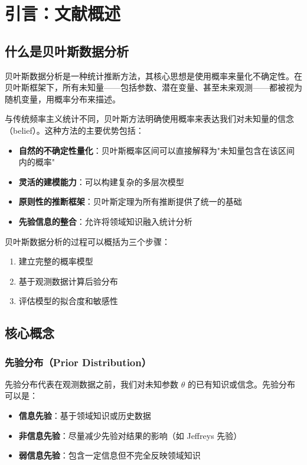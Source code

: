 
\chapter*{引言：文献概述}
\label{chap:introduction}

\section{什么是贝叶斯数据分析}

贝叶斯数据分析是一种统计推断方法，其核心思想是使用概率来量化不确定性。在贝叶斯框架下，所有未知量——包括参数、潜在变量、甚至未来观测——都被视为随机变量，用概率分布来描述。

与传统频率主义统计不同，贝叶斯方法明确使用概率来表达我们对未知量的信念（belief）。这种方法的主要优势包括：

\begin{itemize}
  \item \textbf{自然的不确定性量化}：贝叶斯概率区间可以直接解释为"未知量包含在该区间内的概率"
  \item \textbf{灵活的建模能力}：可以构建复杂的多层次模型
  \item \textbf{原则性的推断框架}：贝叶斯定理为所有推断提供了统一的基础
  \item \textbf{先验信息的整合}：允许将领域知识融入统计分析
\end{itemize}

贝叶斯数据分析的过程可以概括为三个步骤：
\begin{enumerate}
  \item 建立完整的概率模型
  \item 基于观测数据计算后验分布
  \item 评估模型的拟合度和敏感性
\end{enumerate}

\section{核心概念}

\subsection{先验分布（Prior Distribution）}

先验分布代表在观测数据之前，我们对未知参数 $\theta$ 的已有知识或信念。先验分布可以是：
\begin{itemize}
  \item \textbf{信息先验}：基于领域知识或历史数据
  \item \textbf{非信息先验}：尽量减少先验对结果的影响（如 Jeffreys 先验）
  \item \textbf{弱信息先验}：包含一定信息但不完全反映领域知识
\end{itemize}

